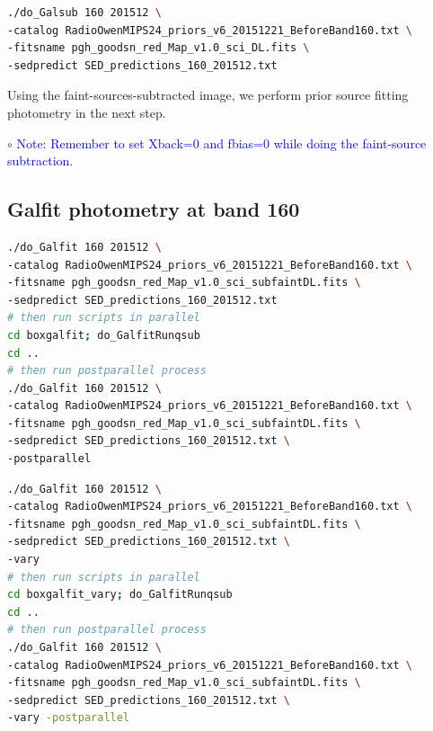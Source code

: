 \documentclass[11pt,a4paper]{article}
\begin{document}
\begin{lstlisting}[language=bash]
./do_Galsub 160 201512 \
-catalog RadioOwenMIPS24_priors_v6_20151221_BeforeBand160.txt \
-fitsname pgh_goodsn_red_Map_v1.0_sci_DL.fits \
-sedpredict SED_predictions_160_201512.txt
\end{lstlisting}


Using the faint-sources-subtracted image, we perform prior source fitting photometry in the next step. 

\indent\hspace{15pt}$\circ$ 
\textcolor{blue}{Note: Remember to set Xback=0 and fbias=0 while doing the faint-source subtraction.}
\\

\subsection{Galfit photometry at band 160}
\label{Band160_Galfit}

\begin{lstlisting}[language=bash]
./do_Galfit 160 201512 \
-catalog RadioOwenMIPS24_priors_v6_20151221_BeforeBand160.txt \
-fitsname pgh_goodsn_red_Map_v1.0_sci_subfaintDL.fits \
-sedpredict SED_predictions_160_201512.txt
# then run scripts in parallel 
cd boxgalfit; do_GalfitRunqsub
cd ..
# then run postparallel process
./do_Galfit 160 201512 \
-catalog RadioOwenMIPS24_priors_v6_20151221_BeforeBand160.txt \
-fitsname pgh_goodsn_red_Map_v1.0_sci_subfaintDL.fits \
-sedpredict SED_predictions_160_201512.txt \
-postparallel
\end{lstlisting}

\begin{lstlisting}[language=bash]
./do_Galfit 160 201512 \
-catalog RadioOwenMIPS24_priors_v6_20151221_BeforeBand160.txt \
-fitsname pgh_goodsn_red_Map_v1.0_sci_subfaintDL.fits \
-sedpredict SED_predictions_160_201512.txt \
-vary
# then run scripts in parallel 
cd boxgalfit_vary; do_GalfitRunqsub
cd ..
# then run postparallel process
./do_Galfit 160 201512 \
-catalog RadioOwenMIPS24_priors_v6_20151221_BeforeBand160.txt \
-fitsname pgh_goodsn_red_Map_v1.0_sci_subfaintDL.fits \
-sedpredict SED_predictions_160_201512.txt \
-vary -postparallel
\end{lstlisting}
\end{document}
